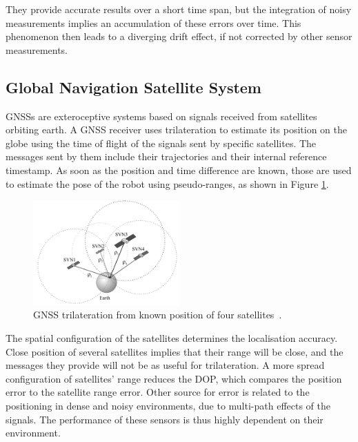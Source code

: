 They provide accurate results over a short time span, but the integration of noisy measurements implies an accumulation of these errors over time. This phenomenon then leads to a diverging drift effect, if not corrected by other sensor measurements.


\subsection{Global Navigation Satellite System}

\noindent \glspl{GNSS} are exteroceptive systems based on signals received from satellites orbiting earth.
A \gls{GNSS} receiver uses trilateration to estimate its position on the globe using the time of flight of the signals sent by specific satellites.  %
The messages sent by them include their trajectories and their internal reference timestamp. 
As soon as the position and time difference are known, those are used to estimate the pose of the robot using pseudo-ranges, as shown in Figure \ref{fig:gps}.
\begin{figure}[!ht]
  \begin{center}
    \includegraphics[width=0.5\textwidth]{Images/2-Background/KaiBorre-p73.png}
  \end{center}
  \caption{\Gls{GNSS} trilateration from known position of four satellites~\cite{Borre2007}.}
  \label{fig:gps}
\end{figure}

The spatial configuration of the satellites determines the localisation accuracy. 
Close position of several satellites implies that their range will be close, and the messages they provide will not be as useful for trilateration.
A more spread configuration of satellites' range reduces the \gls{DOP}, which compares the position error to the satellite range error.
Other source for error is related to the positioning in dense and noisy environments, due to multi-path effects of the signals.
The performance of these sensors is thus highly dependent on their environment.

